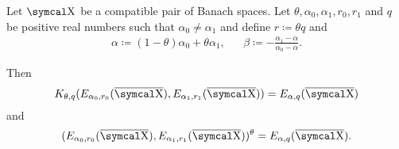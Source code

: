 \begin{theorem}\label{thm:interpolation_space_and_approximation_space}
  Let \( \CX \) be a compatible pair of Banach spaces. Let \( \theta, \alpha_0, \alpha_1, r_0, r_1 \) and \( q \) be positive real numbers such that \( \alpha_0 \neq \alpha_1 \) and define \( r \coloneqq \theta q \) and
  \begin{align*}
    \alpha \coloneqq (1 - \theta) \alpha_0 + \theta \alpha_1,
    &&
    \beta \coloneqq - \frac {\alpha_1 - \alpha} {\alpha_0 - \alpha}.
  \end{align*}

  Then
  \begin{equation*}
    K_{\theta,q}(E_{\alpha_0,r_0}(\Ol{\CX}), E_{\alpha_1,r_1}(\Ol{\CX})) = E_{\alpha,q}(\Ol{\CX})
  \end{equation*}
  and
  \begin{equation*}
    (E_{\alpha_0,r_0}(\Ol{\CX}), E_{\alpha_1,r_1}(\Ol{\CX}))^\theta = E_{\alpha,q}(\Ol{\CX}).
  \end{equation*}
\end{theorem}
